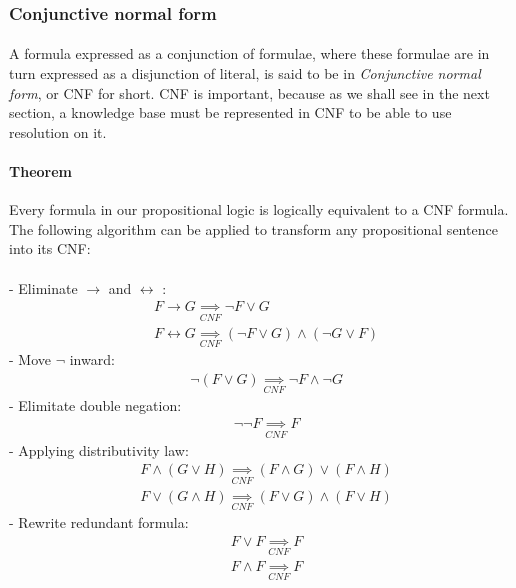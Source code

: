 \documentclass[part1.tex]{subfiles}
\begin{document}
\subsubsection{Conjunctive normal form}
\paragraph{} A formula expressed as a conjunction of formulae, where these formulae are in turn expressed as
a disjunction of literal, is said to be in {\em Conjunctive
normal form}, or CNF for short. CNF is important, because as we
shall see in the next section, a knowledge base must be represented in CNF to be able
to use resolution on it.
\paragraph{Theorem} Every formula in our propositional logic is logically equivalent to a CNF
formula.\\
The following algorithm can be applied to transform any
propositional sentence into its CNF:\\\\
\indent- Eliminate \(\to\) and \(\leftrightarrow\) :
\begin{align*}
	&F \to G \underset{CNF}{\implies} \neg F \vee G\\
	&F \leftrightarrow G \underset{CNF}{\implies} (\neg F \vee G) \wedge (\neg G \vee F)
\end{align*}
\indent- Move \(\neg\) inward: 
\begin{align*}
	&\neg (F \vee G) \underset{CNF}{\implies} \neg F \wedge \neg G
\end{align*}
\indent- Elimitate double negation:
\begin{align*}
	&\neg \neg F \underset{CNF}{\implies} F
\end{align*}
\indent- Applying distributivity law:
\begin{align*}
	&F \wedge (G \vee H) \underset{CNF}{\implies} (F \wedge G) \vee (F \wedge H)\\
	&F \vee (G \wedge H) \underset{CNF}{\implies} (F \vee G) \wedge (F \vee H)
\end{align*}	
\indent- Rewrite redundant formula:
\begin{align*}	
	&F \vee F \underset{CNF}{\implies} F\\
	&F \wedge F \underset{CNF}{\implies} F
\end{align*}
\end{document}

